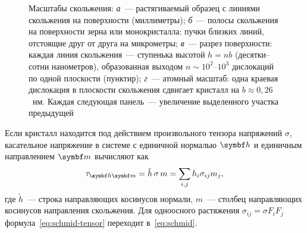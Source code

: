 \begin{figure}[ht]
\caption{Масштабы скольжения: \textit{а}~— растягиваемый образец с
линиями скольжения на поверхности (миллиметры); \textit{б}~— полосы
скольжения на поверхности зерна или монокристалла: пучки близких линий,
отстоящие друг от друга на микрометры; \textit{в}~— разрез поверхности:
каждая линия скольжения~— ступенька высотой $h=nb$ (десятки--сотни
нанометров), образованная выходом $n\sim10^2$--$10^3$ дислокаций по одной
плоскости (пунктир); \textit{г}~— атомный масштаб: одна краевая
дислокация в плоскости скольжения сдвигает кристалл на $b\approx0{,}26$~нм.
Каждая следующая панель~— увеличение выделенного участка предыдущей}
\label{fig:slip-scales}
\end{figure}

Если кристалл находится под действием произвольного тензора напряжений
$\sigma$, касательное напряжение в системе с единичной нормалью $\vb h$ и
единичным направлением $\vb m$ вычисляют как
\begin{equation}\label{eq:schmid-tensor}
\tau_{\vb h\vb m}=\tilde h\,\sigma\, m=\sum_{i,j}h_i\sigma_{ij}m_j ,
\end{equation}
где $\tilde h$~— строка направляющих косинусов нормали, $m$~— столбец
направляющих косинусов направления скольжения. Для одноосного растяжения
$\sigma_{ij}=\sigma F_iF_j$ формула~\eqref{eq:schmid-tensor} переходит
в~\eqref{eq:schmid}.

